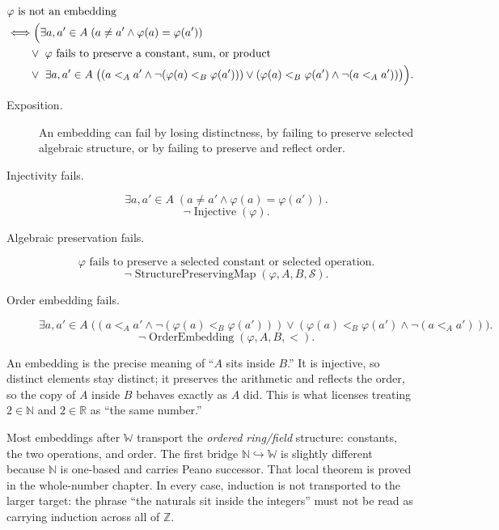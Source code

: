 \begin{remark*}
\[
\begin{aligned}
&\varphi \text{ is not an embedding}\\
&\Longleftrightarrow
\Bigl(\exists a,a'\in A\;(a\neq a'\land \varphi(a)=\varphi(a'))\\
&\qquad\lor\ \varphi \text{ fails to preserve a constant, sum, or product}\\
&\qquad\lor\ \exists a,a'\in A\;\bigl((a<_A a'\land \neg(\varphi(a)<_B\varphi(a')))
\lor(\varphi(a)<_B\varphi(a')\land \neg(a<_A a'))\bigr)\Bigr).
\end{aligned}
\]
\end{remark*}
\begin{remark*}
\begin{description}
  \item[Exposition.] An embedding can fail by losing distinctness, by failing to preserve selected algebraic structure, or by failing to preserve and reflect order.
  \item[Injectivity fails.]
  \[
  \exists a,a'\in A\;(a\ne a'\land \varphi(a)=\varphi(a')).
  \]
  \[
  \neg\operatorname{Injective}(\varphi).
  \]
  \item[Algebraic preservation fails.]
  \[
  \text{$\varphi$ fails to preserve a selected constant or selected operation.}
  \]
  \[
  \neg\operatorname{StructurePreservingMap}(\varphi,A,B,\mathcal{S}).
  \]
  \item[Order embedding fails.]
  \[
  \exists a,a'\in A\;\bigl((a<_A a'\land \neg(\varphi(a)<_B\varphi(a')))
  \lor(\varphi(a)<_B\varphi(a')\land \neg(a<_A a'))\bigr).
  \]
  \[
  \neg\operatorname{OrderEmbedding}(\varphi,A,B,<).
  \]
\end{description}
\end{remark*}
\begin{remark*}[Interpretation]
An embedding is the precise meaning of ``$A$ sits inside $B$.'' It is injective, so distinct elements stay distinct; it preserves the arithmetic and reflects the order, so the copy of $A$ inside $B$ behaves exactly as $A$ did. This is what licenses treating $2\in\mathbb{N}$ and $2\in\mathbb{R}$ as ``the same number.''


Most embeddings after $\mathbb{W}$ transport the \emph{ordered ring/field}
structure: constants, the two operations, and order. The first bridge
$\mathbb{N}\hookrightarrow\mathbb{W}$ is slightly different because
$\mathbb{N}$ is one-based and carries Peano successor. That local theorem is
proved in the whole-number chapter. In every case, induction is not transported
to the larger target: the phrase ``the naturals sit inside the integers'' must
not be read as carrying induction across all of $\mathbb{Z}$.
\end{remark*}
